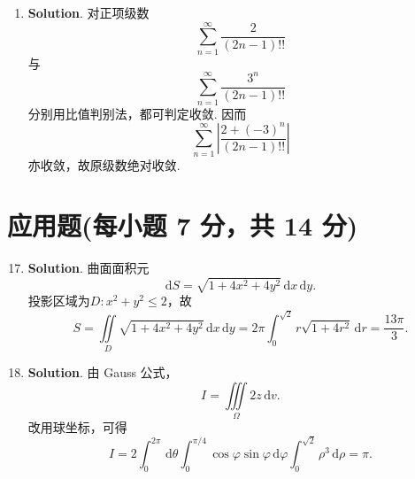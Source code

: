 \documentclass[../Main.tex]{subfiles}
\begin{document}
\begin{enumerate}
    \item \textbf{Solution}. 对正项级数
          \[
              \sum_{n=1}^{\infty}\frac{2}{(2n-1)!!}
          \]
          与
          \[
              \sum_{n=1}^{\infty}\frac{3^{n}}{(2n-1)!!}
          \]
          分别用比值判别法，都可判定收敛.
          因而
          \[
              \sum_{n=1}^{\infty}\left|\frac{2+(-3)^{n}}{(2n-1)!!}\right|
          \]
          亦收敛，故原级数绝对收敛.
\end{enumerate}

\section{应用题(每小题 7 分，共 14 分)}
\begin{enumerate}
    \setcounter{enumi}{16}
    \item \textbf{Solution}. 曲面面积元
          \[
              \mathrm{d}S=\sqrt{1+4x^{2}+4y^{2}}\,\mathrm{d}x\,\mathrm{d}y.
          \]
          投影区域为$D:x^{2}+y^{2}\le2$，故
          \[
              S=\iint\limits_{D}\sqrt{1+4x^{2}+4y^{2}}\,\mathrm{d}x\,\mathrm{d}y
              =2\pi\int_{0}^{\sqrt2}r\sqrt{1+4r^{2}}\,\mathrm{d}r
              =\frac{13\pi}{3}.
          \]

    \item \textbf{Solution}. 由 Gauss 公式，
          \[
              I=\iiint\limits_{\Omega}2z\,\mathrm{d}v.
          \]
          改用球坐标，可得
          \[
              I=2\int_{0}^{2\pi}\,\mathrm{d}\theta\int_{0}^{\pi/4}\cos\varphi\sin\varphi\,\mathrm{d}\varphi\int_{0}^{\sqrt2}\rho^{3}\,\mathrm{d}\rho=\pi.
          \]
\end{enumerate}
\end{document}
